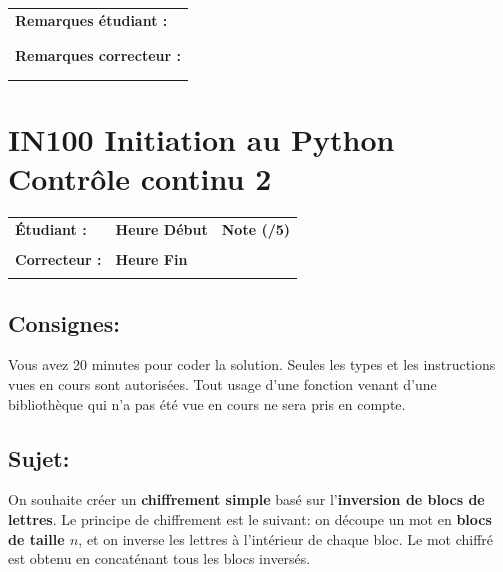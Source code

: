 \documentclass[a4paper,11pt]{article}
\begin{document}
\begin{table}[h!]
\centering
\renewcommand{\arraystretch}{1.4} %
\begin{tabular}{|p{15cm}|}
\hline
\textbf{Remarques étudiant :}    \\
 \\
 \\
\hline
\textbf{Remarques correcteur :}  \\
 \\
 \\
\hline
\end{tabular}
\end{table}


\newpage


\section*{\center IN100 Initiation au Python\\
Contrôle continu 2}


\begin{table}[h!]
\centering
\renewcommand{\arraystretch}{1.4} %
\begin{tabular}{|p{10cm}|p{3cm}|p{2cm}|}
\hline
\textbf{Étudiant :} & \textbf{Heure Début }  & \textbf{Note (/5) }  \\
& & \\
\hline
\textbf{Correcteur :} & \textbf{Heure Fin } & \\
& & \\
\hline

\hline
\end{tabular}
\end{table}
\vspace*{-0.4 cm}
\subsection*{Consignes:} Vous avez 20 minutes pour coder la solution. Seules les types et les instructions vues en cours sont autorisées. Tout usage d'une fonction 
venant d'une bibliothèque qui n'a pas été vue en cours ne sera pris en compte. 

\vspace*{-0.3 cm}
\subsection*{Sujet:}


On souhaite créer un \textbf{chiffrement simple} basé sur l'\textbf{inversion de blocs de lettres}.
Le principe de chiffrement est le suivant: on découpe un mot en \textbf{blocs de taille $n$},  et
on inverse les lettres à l’intérieur de chaque bloc.  Le mot chiffré est obtenu en concaténant tous les blocs inversés.
\end{document}

